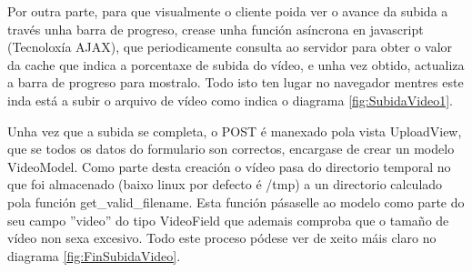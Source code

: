        Por outra parte, para que visualmente o cliente poida ver o avance da subida a través unha
        barra de progreso, crease unha función asíncrona en javascript (Tecnoloxía AJAX), que 
        periodicamente consulta ao servidor para obter o valor da cache que indica a porcentaxe de
        subida do vídeo, e unha vez obtido, actualiza a barra de progreso para mostralo. Todo isto
        ten lugar no navegador mentres este inda está a subir o arquivo de vídeo como indica o 
        diagrama \ref{fig:SubidaVideo1}.

        Unha vez que a subida se completa, o POST é manexado pola vista UploadView, que se todos
        os datos do formulario son correctos, encargase de crear un modelo VideoModel. Como parte
        desta creación o vídeo pasa do directorio temporal no que foi almacenado (baixo linux por 
        defecto é /tmp) a un directorio calculado pola función get\_valid\_filename. Esta función
        pásaselle ao modelo como parte do seu campo ''video'' do tipo VideoField que ademais 
        comproba que o tamaño de vídeo non sexa excesivo. Todo este proceso
        pódese ver de xeito máis claro no diagrama \ref{fig:FinSubidaVideo}.
        
